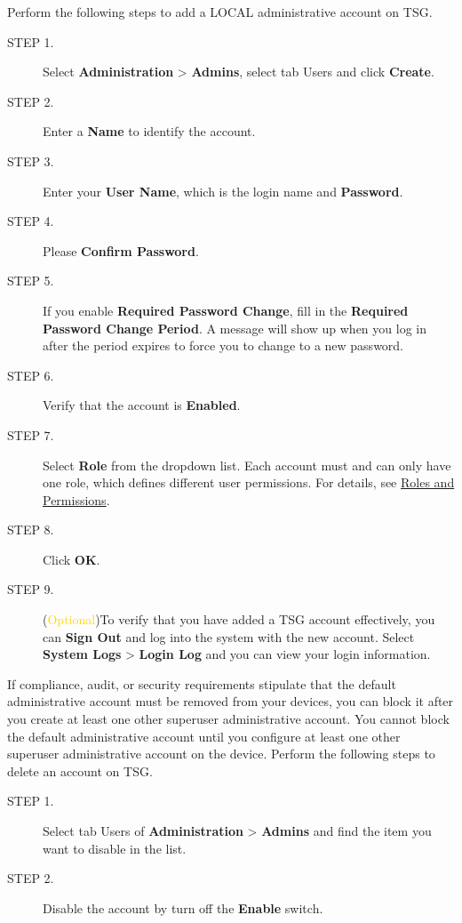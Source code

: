 Perform the following steps to add a LOCAL administrative account on TSG.\\
\begin{description}
    \item[STEP 1.] Select \textbf{Administration} > \textbf{Admins}, select tab Users and click \textbf{Create}.
    \item[STEP 2.] Enter a \textbf{Name} to identify the account.
    \item[STEP 3.] Enter your \textbf{User Name}, which is the login name and \textbf{Password}. 
    \item[STEP 4.] Please \textbf{Confirm Password}.
    \item[STEP 5.] If you enable \textbf{Required Password Change}, fill in the \textbf{Required Password Change Period}. 
    A message will show up when you log in after the period expires to force you to change to a new password.
    \item[STEP 6.] Verify that the account is \textbf{Enabled}.
    \item[STEP 7.] Select \textbf{Role} from the dropdown list. Each account must and can only have one role, which defines different user permissions. 
    For details, see \hyperlink{link:Roles and Permissions}{\textcolor{linkblue}{Roles and Permissions}}.
    \item[STEP 8.] Click \textbf{OK}.
    \item[STEP 9.] (\textcolor{gold}{Optional})To verify that you have added a TSG account effectively, you can \textbf{Sign Out} and log into the system with the new account. 
    Select \textbf{System Logs} > \textbf{Login Log} and you can view your login information.
\end{description}
If compliance, audit, or security requirements stipulate that the default administrative account must be removed from your devices, 
you can block it after you create at least one other superuser administrative account. 
You cannot block the default administrative account until you configure at least one other superuser administrative account on the device. 
Perform the following steps to delete an account on TSG.\\
\begin{description}
    \item[STEP 1.] Select tab Users of \textbf{Administration} > \textbf{Admins} and find the item you want to disable in the list.
    \item[STEP 2.] Disable the account by turn off the \textbf{Enable} switch.
\end{description}


